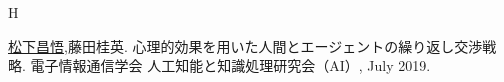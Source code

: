\externals
\begin{externalsenum}{H}
\item \underline{松下昌悟},藤田桂英.
    心理的効果を用いた人間とエージェントの繰り返し交渉戦略.
    電子情報通信学会 人工知能と知識処理研究会（AI）, July 2019.
\end{externalsenum}
